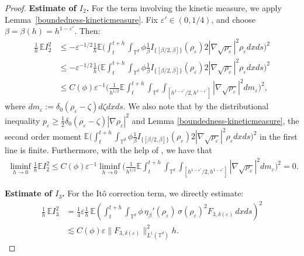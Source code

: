 \documentclass[UTF-8,reqno]{amsart}
\numberwithin{equation}{section}
\def\geq{\geqslant}
\def\leq{\leqslant}
\def\geq{\geqslant}
\def\leq{\leqslant}
\begin{document}
\begin{proof}
\medskip
\noindent\textbf{Estimate of $ I_2 $.} For the term involving the kinetic measure, we apply Lemma~\ref{boundedness-kineticmeasure}. Fix $ \varepsilon' \in (0, 1/4) $, and choose $ \beta = \beta(h) = h^{1 - \varepsilon'} $. Then:
\begin{align*}
\frac{1}{h} \, \mathbb{E} I_2^2 
&\leq-\varepsilon^{-1/2}\frac{1}{h}\mathbb{E}\Big(\int^{t+h}_t\int_{\mathbb{T}^d}\phi\frac{1}{\beta}I_{\{[\beta/2,\beta]\}}(\rho_{\varepsilon})2|\nabla\sqrt{\rho_{\varepsilon}}|^2\rho_{\varepsilon}dxds\Big)^2 \\
&\leq-\varepsilon^{-1/2}\frac{1}{h}\Big(\mathbb{E}\int^{t+h}_t\int_{\mathbb{T}^d}\phi\frac{1}{\beta}I_{\{[\beta/2,\beta]\}}(\rho_{\varepsilon})2|\nabla\sqrt{\rho_{\varepsilon}}|^2\rho_{\varepsilon}dxds\Big)^2 \\
&\leq C(\phi) \varepsilon^{-1}  \Big(\frac{1}{h^{1/2}}\mathbb{E}\int^{t+h}_t\int_{\mathbb{T}^d}\int_{[h^{1-\varepsilon'}/2,h^{1-\varepsilon'}]}|\nabla\sqrt{\rho_{\varepsilon}}|^2dm_{\varepsilon}\Big)^2,
\end{align*}
where $dm_{\varepsilon}:=\delta_{0}(\rho_{\varepsilon}-\zeta)d\zeta dxds$. We also note that by the distributional inequality $p_{\varepsilon}\geq\frac{1}{2}\delta_0(\rho_{\varepsilon}-\zeta)|\nabla\rho_{\varepsilon}|^2$ and Lemma \ref{boundedness-kineticmeasure}, the second order moment $\mathbb{E}\Big(\int^{t+h}_t\int_{\mathbb{T}^d}\phi\frac{1}{\beta}I_{\{[\beta/2,\beta]\}}(\rho_{\varepsilon})2|\nabla\sqrt{\rho_{\varepsilon}}|^2\rho_{\varepsilon}dxds\Big)^2$ in the first line is finite. Furthermore, with the help of \cite[Lemma 7]{FG23}, we have that 
\begin{align*}
\liminf_{h\rightarrow0}\frac{1}{h}\mathbb{E}I_2^2\leq C(\phi) \varepsilon^{-1}  \liminf_{h\rightarrow0}\Big(\frac{1}{h^{1/2}}\mathbb{E}\int^{t+h}_t\int_{\mathbb{T}^d}\int_{[h^{1-\varepsilon'}/2,h^{1-\varepsilon'}]}|\nabla\sqrt{\rho_{\varepsilon}}|^2dm_{\varepsilon}\Big)^2=0. 	
\end{align*}



\medskip
\noindent\textbf{Estimate of $ I_3 $.} For the It\^o correction term, we directly estimate:
\begin{align*}
\frac{1}{h} \, \mathbb{E} I_3^2 
&= \frac{1}{4} \varepsilon \frac{1}{h} \, \mathbb{E} \left( \int_t^{t+h} \int_{\mathbb{T}^d} \phi \, \eta_{\beta}'(\rho_{\varepsilon}) \, \sigma(\rho_{\varepsilon})^2 F_{3,\delta(\varepsilon)} \, dx ds \right)^2 \\
&\lesssim C(\phi) \varepsilon \|F_{3,\delta(\varepsilon)}\|_{L^1(\mathbb{T}^d)}^2 h.
\end{align*}






\end{proof}
\end{document}
